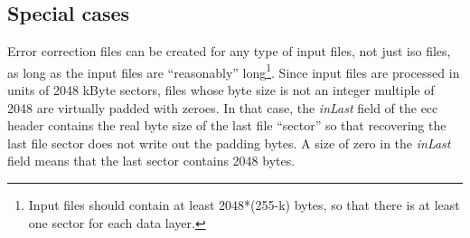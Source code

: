 \subsection{Special cases}

Error correction files can be created for any type of input files, not just iso files,
as long as the input files are ``reasonably'' long\footnote{Input files should contain
at least 2048*(255-k) bytes, so that there is at least one sector for each data
layer.}. Since input files are processed in units of 2048 kByte sectors, 
files whose byte size is not an integer multiple of 2048 are virtually padded 
with zeroes. In that case, the {\em inLast} field of the ecc header
contains the real byte size of the last file ``sector'' so that recovering the
last file sector does not write out the padding bytes. A size of zero in the
{\em inLast} field means that the last sector contains 2048 bytes.
